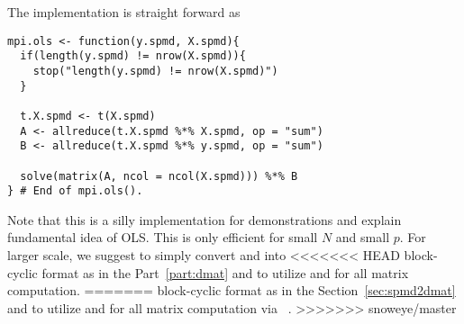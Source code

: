 The implementation is straight forward as
\begin{lstlisting}[language=rr,title=R Code]
mpi.ols <- function(y.spmd, X.spmd){
  if(length(y.spmd) != nrow(X.spmd)){
    stop("length(y.spmd) != nrow(X.spmd)")
  }

  t.X.spmd <- t(X.spmd)
  A <- allreduce(t.X.spmd %*% X.spmd, op = "sum")
  B <- allreduce(t.X.spmd %*% y.spmd, op = "sum")

  solve(matrix(A, ncol = ncol(X.spmd))) %*% B
} # End of mpi.ols().

\end{lstlisting}
Note that this is a silly implementation for demonstrations and
explain fundamental idea of OLS.
This is only efficient for small $N$ and small $p$. For larger scale,
we suggest to simply convert  and  into
<<<<<<< HEAD
block-cyclic format as in the Part~\ref{part:dmat} and
to utilize  and  for all matrix computation.
=======
block-cyclic format as in the Section~\ref{sec:spmd2dmat} and
to utilize  and  for all matrix computation
via ~\citep{Chen2012pbdSLAPpackage}.
>>>>>>> snoweye/master

